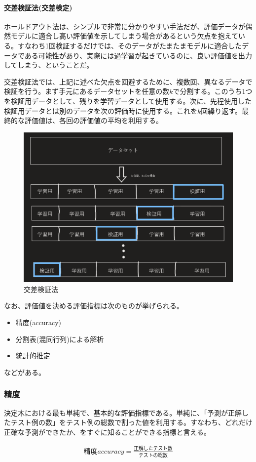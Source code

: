 \documentclass[dvipdfmx]{jsarticle}
\begin{document}
\paragraph{交差検証法(交差検定)}\par
ホールドアウト法は、シンプルで非常に分かりやすい手法だが、評価データが偶然モデルに適合し高い評価値を示してしまう場合があるという欠点を抱えている。すなわち1回検証するだけでは、そのデータがたまたまモデルに適合したデータである可能性があり、実際には過学習が起きているのに、良い評価値を出力してしまう、ということだ。\par
交差検証法では、上記に述べた欠点を回避するために、複数回、異なるデータで検証を行う。まず手元にあるデータセットを任意の数$k$で分割する。このうち1つを検証用データとして、残りを学習データとして使用する。次に、先程使用した検証用データとは別のデータを次の評価時に使用する。これを$k$回繰り返す。最終的な評価値は、各回の評価値の平均を利用する。
\begin{figure}[H]
  \centering
  \includegraphics[scale=0.3]{cross.PNG}
  \caption{交差検証法}
\end{figure}
なお、評価値を決める評価指標は次のものが挙げられる。
\begin{itemize}
  \item 精度(accuracy)
  \item 分割表(混同行列)による解析
  \item 統計的推定
\end{itemize}
などがある。
\subsubsection{精度}
決定木における最も単純で、基本的な評価指標である。単純に、「予測が正解したテスト例の数」をテスト例の総数で割った値を利用する。すなわち、どれだけ正確な予測ができたか、をすぐに知ることができる指標と言える。
\begin{center}
  \begin{align*}
    精度accuracy = \frac{正解したテスト数}{テストの総数}
  \end{align*}
\end{center}
\end{document}
